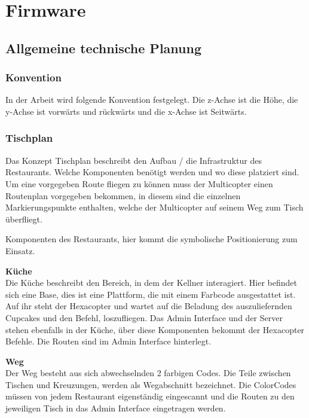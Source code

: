 \chapter{Firmware}
\renewcommand{\kapitelautor}{Autor: Christina Bornberg, Lucas Ullrich}

\section{Allgemeine technische Planung}

  \subsection{Konvention}
  In der Arbeit wird folgende Konvention festgelegt. Die z-Achse ist die Höhe, die y-Achse ist vorwärts und rückwärts und die x-Achse ist Seitwärts.


  \subsection{Tischplan}
  Das Konzept Tischplan beschreibt den Aufbau / die Infrastruktur des Restaurants. Welche Komponenten benötigt werden und wo diese platziert sind.
  Um eine vorgegeben Route fliegen zu können muss der Multicopter einen Routenplan vorgegeben bekommen, in diesem sind die einzelnen Markierungspunkte enthalten, welche der Multicopter auf seinem Weg zum Tisch überfliegt.

  Komponenten des Restaurants, hier kommt die symbolische Positionierung zum Einsatz.

  \textbf{Küche}\\
  Die Küche beschreibt den Bereich, in dem der Kellner interagiert. Hier befindet sich eine Base, dies ist eine Plattform, die mit einem Farbcode ausgestattet ist. Auf ihr steht der Hexacopter und wartet auf die Beladung des auszuliefernden Cupcakes und den Befehl, loszufliegen.
  Das Admin Interface und der Server stehen ebenfalls in der Küche, über diese Komponenten bekommt der Hexacopter Befehle. Die Routen sind im Admin Interface hinterlegt.

  \textbf{Weg}\\
  Der Weg besteht aus sich abwechselnden 2 farbigen Codes. Die Teile zwischen Tischen und Kreuzungen, werden als Wegabschnitt bezeichnet. Die ColorCodes müssen von jedem Restaurant eigenständig eingescannt und die Routen zu den jeweiligen Tisch in das Admin Interface eingetragen werden.

